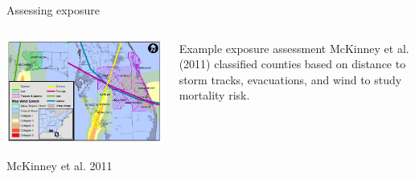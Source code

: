 \documentclass[ignorenonframetext,]{beamer}
\begin{document}
\begin{frame}{Assessing exposure}

\begin{columns}
\begin{column}{0.7\textwidth}

\begin{center}\includegraphics[width=\textwidth]{florida_direct_indirect_mortality_figure} \end{center}
\vspace{-0.6cm}
\begin{center}
\footnotesize McKinney et al. 2011
\end{center}
\end{column}
\begin{column}{0.3\textwidth}
\small
\begin{block}{Example exposure assessment}
McKinney et al. (2011) classified counties based on distance to storm tracks, evacuations, and wind to study mortality risk.
\end{block}
\end{column}
\end{columns}

\end{frame}
\end{document}
